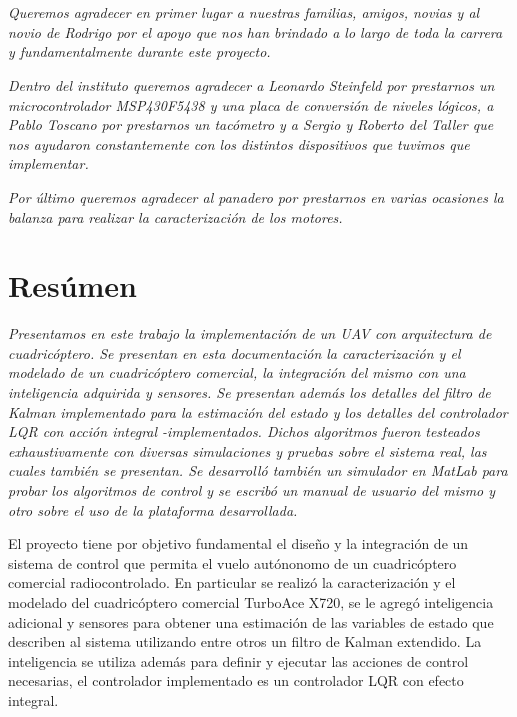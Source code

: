\documentclass[main]{subfiles}
\begin{document}
\chapter*{}
\begin{flushright}
\textit{
Queremos agradecer en primer lugar a nuestras familias, amigos, novias 
y al novio de Rodrigo por el apoyo que nos han brindado a lo largo de
toda la carrera y fundamentalmente durante este proyecto.}
\end{flushright}

\begin{flushright}
\textit{
Dentro del instituto queremos agradecer a Leonardo Steinfeld por prestarnos un microcontrolador MSP430F5438 y una placa de 
conversi\'on de niveles l\'ogicos, a Pablo Toscano por prestarnos un tac\'ometro y a Sergio y Roberto del Taller que nos ayudaron constantemente con los distintos dispositivos que tuvimos que implementar.
}
\end{flushright} 

\begin{flushright}
\textit{
Por \'ultimo queremos agradecer al panadero por prestarnos en varias ocasiones la balanza para realizar la caracterizaci\'on de los motores.
}
\end{flushright}



\chapter*{Res\'umen}
\begin{flushright}
\textit{Presentamos en este trabajo la implementaci\'on de un UAV con arquitectura de cuadric\'optero. Se presentan en esta documentaci\'on la caracterizaci\'on y el modelado de un cuadric\'optero comercial, la integraci\'on del mismo con una inteligencia adquirida y sensores. Se presentan adem\'as los detalles del filtro de Kalman implementado para la estimaci\'on del estado y los detalles del controlador LQR con acci\'on integral -implementados. Dichos algoritmos fueron testeados exhaustivamente con diversas simulaciones y pruebas sobre el sistema real, las cuales tambi\'en se presentan. Se desarroll\'o tambi\'en un simulador en \emph{MatLab} para probar los algoritmos de control y se escrib\'o un manual de usuario del mismo y otro sobre el uso de la plataforma desarrollada.
}
\end{flushright}

El proyecto tiene por objetivo fundamental el diseño y la integración de un sistema de control que permita el vuelo autónonomo de un cuadricóptero comercial radiocontrolado. En particular se realizó la caracterizaci\'on y el modelado del cuadric\'optero comercial TurboAce X720,  se le agregó inteligencia adicional y sensores para obtener una estimación de las variables de estado que describen al sistema utilizando entre otros un filtro de Kalman extendido. La inteligencia se utiliza además para definir y ejecutar las acciones de control necesarias, el controlador implementado es un controlador LQR con efecto integral.   
\end{document}
